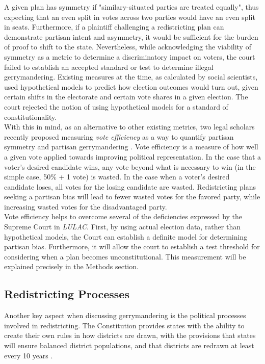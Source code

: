 \documentclass[12pt]{article}
\begin{document}
  A given plan has symmetry if "similary-situated parties are treated equally", thus expecting that an even split in votes across two parties would have an even split in seats. Furthermore, if a plaintiff challenging a redistricting plan can demonstrate partisan intent and asymmetry, it would be sufficient for the burden of proof to shift to the state.  Nevertheless, while acknowledging the viability of symmetry as a metric to determine a discriminatory impact on voters, the court failed to establish an accepted standard or test to determine illegal gerrymandering.  Existing measures at the time, as calculated by social scientists, used hypothetical models to predict how election outcomes would turn out, given certain shifts in the electorate and certain vote shares in a given election. The court rejected the notion of using hypothetical models for a standard of constitutionality. \cite{LULAC v. Perry} \\
  
  With this in mind,  as an alternative to other existing metrics, two legal scholars recently proposed measuring \textit{vote efficiency} as a way to quantify partisan symmetry and partisan gerrymandering \cite{Stephanopolous & McGhee}.  Vote efficiency is a measure of how well a given vote applied towards improving political representation.  In the case that a voter's desired candidate wins, any vote beyond what is necessary to win (in the simple case, 50\% + 1 vote) is wasted.  In the case when a voter's desired candidate loses, all votes for the losing candidate are wasted. Redistricting plans seeking a partisan bias will lead to fewer wasted votes for the favored party, while increasing wasted votes for the disadvantaged party. \\
  
  Vote efficiency helps to overcome several of the deficiencies expressed by the Supreme Court in \textit{LULAC}.  First, by using actual election data, rather than hypothetical models, the Court can establish a definite model for determining partisan bias.  Furthermore, it will allow the court to establish a test threshold for considering when a plan becomes unconstitutional.  This measurement will be explained precisely in the Methods section.

\subsection{Redistricting Processes}
Another key aspect when discussing gerrymandering is the political processes involved in redistricting.  The Constitution provides states with the ability to create their own rules in how districts are drawn, with the provisions that states will ensure balanced district populations, and that districts are redrawn at least every 10 years \cite{LULAC v. Perry}.\\
\end{document}
